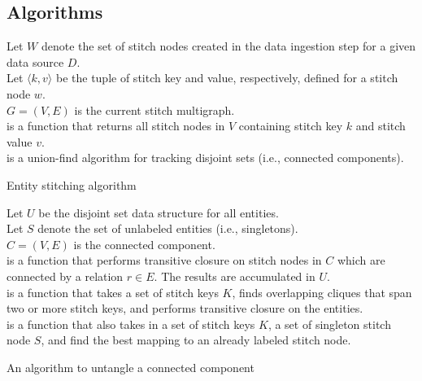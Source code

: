 \documentclass{bmcart}
\begin{document}
\begin{backmatter}
\section*{Algorithms}
\begin{algorithm}[ht!]\label{algo:stitching}
\SetAlgoLined
\DontPrintSemicolon
Let $W$ denote the set of stitch nodes created in the data ingestion
step for a given data source $D$.\\
Let $\langle k, v\rangle$ be the tuple of stitch key and value,
respectively, defined for a stitch node $w$.\\
$G=(V,E)$ is the current stitch multigraph.\\
 is a function that returns all stitch nodes in $V$
containing stitch key $k$ and stitch value $v$.\\
 is a union-find algorithm for tracking disjoint sets
(i.e., connected components).\\
 \caption{Entity stitching algorithm}
\end{algorithm}

\begin{algorithm}[ht!]\label{algo:untangle}
\SetAlgoLined
\DontPrintSemicolon
Let $U$ be the disjoint set data structure for all entities.\\
Let $S$ denote the set of unlabeled entities (i.e., singletons).\\
$C=(V,E)$ is the connected component.\\
 is a function that performs transitive closure on
stitch nodes in $C$ which are connected by a relation $r\in E$. The results are
accumulated in $U$.\\
 is a function that takes a set of stitch keys
$K$, finds overlapping cliques that span two or more stitch keys,
and performs transitive closure on the entities.\\
 is a function that also takes in a set of
stitch keys $K$, a set of singleton stitch node $S$, and find the best
mapping to an already labeled stitch node.\\
\;
\;
\;
\;
\;
 \caption{An algorithm to untangle a connected component}
\end{algorithm}


\end{backmatter}
\end{document}
